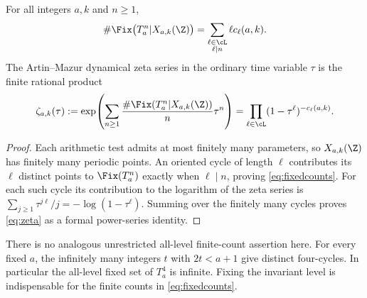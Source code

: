 \begin{corollary}
\label{cor:zeta}
For all integers $a,k$ and $n\ge1$,
\begin{equation}
 \#\Fix\bigl(T_a^n\vert X_{a,k}(\Z)\bigr)
 =\sum_{\substack{\ell\in\cL\\\ell\mid n}}
   \ell c_\ell(a,k).
 \label{eq:fixedcounts}
\end{equation}
The Artin--Mazur dynamical zeta series in the ordinary time
variable $\tau$ is the finite rational product
\begin{equation}
 \zeta_{a,k}(\tau)
 :=\exp\!\left(\sum_{n\ge1}
 \frac{\#\Fix(T_a^n\vert X_{a,k}(\Z))}{n}\tau^n\right)
 =\prod_{\ell\in\cL}(1-\tau^\ell)^{-c_\ell(a,k)}.
 \label{eq:zeta}
\end{equation}
\end{corollary}
\begin{proof}
Each arithmetic test admits at most finitely many parameters,
so $X_{a,k}(\Z)$ has finitely many periodic points.
An oriented cycle of length $\ell$ contributes its
$\ell$ distinct points to $\Fix(T_a^n)$ exactly when
$\ell\mid n$, proving \eqref{eq:fixedcounts}.
For each such cycle its contribution to the logarithm of
the zeta series is
$\sum_{j\ge1}\tau^{j\ell}/j=-\log(1-\tau^\ell)$.
Summing over the finitely many cycles proves
\eqref{eq:zeta} as a formal power-series identity.
\end{proof}

There is no analogous unrestricted all-level finite-count
assertion here. For every fixed $a$, the infinitely many
integers $t$ with $2t<a+1$ give distinct four-cycles.
In particular the all-level fixed set of $T_a^4$ is
infinite. Fixing the invariant level is indispensable for
the finite counts in \eqref{eq:fixedcounts}.
